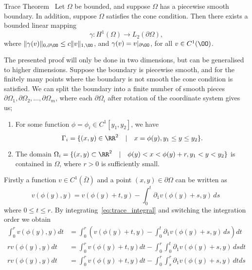 \begin{thmx}{Trace Theorem}~\label{thm:trace}
    Let $\Omega$ be bounded, and suppose $\Omega$ has a piecewise smooth boundary. In addition, suppose $\Omega$ satisfies the cone condition. Then there exists a bounded linear mapping 
    \begin{equation*}
        \gamma : H^1(\Omega) \to L_2(\partial \Omega),
    \end{equation*}
    where $\|\gamma(v)\|_{0,\partial \OO} \leq c \|v\|_{1,\OO}$, and $\gamma (v) = v|_{\partial \OO}$, for all $v\in C^1(\OO)$.
\end{thmx}
\begin{bev}
    The presented proof will only be done in two dimensions, but can be generalised to higher dimensions.
    Suppose the boundary is piecewise smooth, and for the finitely many points where the boundary is not smooth the cone condition is satisfied. We can split the boundary into a finite number of smooth pieces $\partial \Omega_1, \partial \Omega_2, \dots, \partial \Omega_m$, where each $\partial \Omega_i$ after rotation of the coordinate system gives us;
    \begin{enumerate}
        \item For some function $\phi = \phi_i \in C^1[y_1, y_2]$, we have
            \[ \Gamma_i = \{ (x,y) \in \RR^2 \quad | \quad x = \phi(y), y_1 \leq y \leq y_2 \}. \]
        \item The domain $\Omega_i = \{ (x,y) \subset \RR^2 \quad | \quad \phi(y) < x <\phi(y) + r, y_1 < y < y_2 \}$ is contained in $\Omega$, where $r > 0$ is sufficiently small. 
    \end{enumerate}
    Firstly a function $v \in C^1(\bar{\Omega})$ and a point $(x,y) \in \partial \Omega$ can be written as
    \begin{equation}
            v(\phi(y), y) = v(\phi(y) + t, y) - \int_0^t \partial_1 v(\phi(y) + s, y) \, ds~\label{eq:trace_integral}
    \end{equation}
    where $0 \leq t \leq r$. By integrating~\eqref{eq:trace_integral} and switching the integration order we obtain 
    \begin{align*}
        \int_0^r v(\phi(y), y) dt &= \int_0^r \left(   v(\phi(y) + t, y) - \int_0^t \partial_1 v(\phi(y) + s, y) \, ds \right) dt \\
        r v(\phi(y), y) dt &= \int_0^r   v(\phi(y) + t, y) dt - \int_0^r \int_0^t \partial_1 v(\phi(y) + s, y) \, ds dt \\
        r v(\phi(y), y) dt &= \int_0^r   v(\phi(y) + t, y) dt - \int_0^r \int_s^r \partial_1 v(\phi(y) + s, y) \, dt ds \\

\end{align*}
\end{bev}
